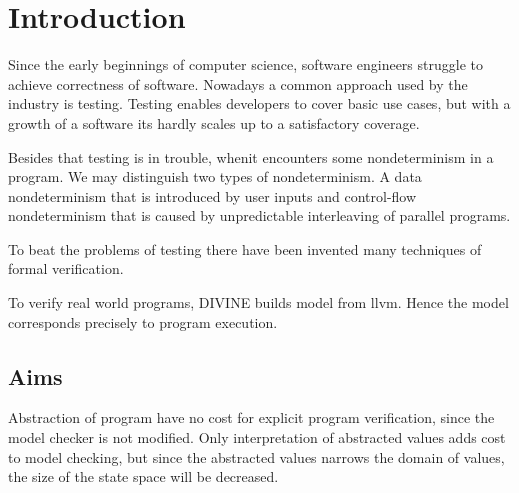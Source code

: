 \chapter{Introduction}\label{ch:Introduction}


\noindent
Since the early beginnings of computer science, software engineers struggle to
achieve correctness of software. Nowadays a common approach used by the industry
is testing. Testing enables developers to cover basic use cases, but with a
growth of a software its hardly scales up to a satisfactory coverage.

Besides that testing is in trouble, whenit encounters some nondeterminism in a
program. We may distinguish two types of nondeterminism. A data nondeterminism
that is introduced by user inputs and control-flow nondeterminism that is caused
by unpredictable interleaving of parallel programs.

To beat the problems of testing there have been invented many techniques of
formal verification.



 To verify real world programs, DIVINE builds
model from llvm. Hence the model corresponds precisely to program execution.

\section{Aims}

Abstraction of program have no cost for explicit program verification, since
the model checker is not modified. Only interpretation of abstracted values adds
cost to model checking, but since the abstracted values narrows the domain of
values, the size of the state space will be decreased.



